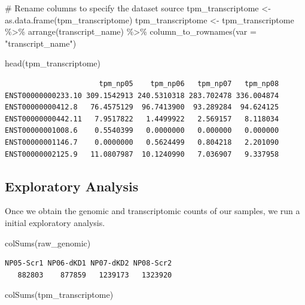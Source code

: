 \documentclass[
  letterpaper,
  DIV=11,
  numbers=noendperiod]{scrartcl}
\newenvironment{Shaded}{\begin{snugshade}}{\end{snugshade}}
\newcommand{\AttributeTok}[1]{\textcolor[rgb]{0.40,0.45,0.13}{#1}}
\newcommand{\CommentTok}[1]{\textcolor[rgb]{0.37,0.37,0.37}{#1}}
\newcommand{\FunctionTok}[1]{\textcolor[rgb]{0.28,0.35,0.67}{#1}}
\newcommand{\NormalTok}[1]{\textcolor[rgb]{0.00,0.23,0.31}{#1}}
\newcommand{\OtherTok}[1]{\textcolor[rgb]{0.00,0.23,0.31}{#1}}
\newcommand{\SpecialCharTok}[1]{\textcolor[rgb]{0.37,0.37,0.37}{#1}}
\newcommand{\StringTok}[1]{\textcolor[rgb]{0.13,0.47,0.30}{#1}}
\begin{document}
\begin{Shaded}
\begin{Highlighting}[]
\CommentTok{\# Rename columns to specify the dataset source}
\NormalTok{tpm\_transcriptome }\OtherTok{\textless{}{-}} \FunctionTok{as.data.frame}\NormalTok{(tpm\_transcriptome)}
\NormalTok{tpm\_transcriptome  }\OtherTok{\textless{}{-}}\NormalTok{ tpm\_transcriptome  }\SpecialCharTok{\%\textgreater{}\%}
  \FunctionTok{arrange}\NormalTok{(transcript\_name) }\SpecialCharTok{\%\textgreater{}\%}
  \FunctionTok{column\_to\_rownames}\NormalTok{(}\AttributeTok{var =} \StringTok{"transcript\_name"}\NormalTok{)}

\FunctionTok{head}\NormalTok{(tpm\_transcriptome)}
\end{Highlighting}
\end{Shaded}

\begin{verbatim}
                      tpm_np05    tpm_np06   tpm_np07   tpm_np08
ENST00000000233.10 309.1542913 240.5310318 283.702478 336.004874
ENST00000000412.8   76.4575129  96.7413900  93.289284  94.624125
ENST00000000442.11   7.9517822   1.4499922   2.569157   8.118034
ENST00000001008.6    0.5540399   0.0000000   0.000000   0.000000
ENST00000001146.7    0.0000000   0.5624499   0.804218   2.201090
ENST00000002125.9   11.0807987  10.1240990   7.036907   9.337958
\end{verbatim}

\hypertarget{exploratory-analysis}{%
\subsection{Exploratory Analysis}\label{exploratory-analysis}}

Once we obtain the genomic and transcriptomic counts of our samples, we
run a initial exploratory analysis.

\begin{Shaded}
\begin{Highlighting}[]
\FunctionTok{colSums}\NormalTok{(raw\_genomic)}
\end{Highlighting}
\end{Shaded}

\begin{verbatim}
NP05-Scr1 NP06-dKD1 NP07-dKD2 NP08-Scr2 
   882803    877859   1239173   1323920 
\end{verbatim}

\begin{Shaded}
\begin{Highlighting}[]
\FunctionTok{colSums}\NormalTok{(tpm\_transcriptome)}
\end{Highlighting}
\end{Shaded}
\end{document}
